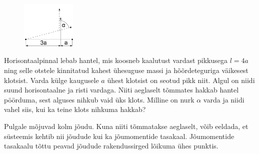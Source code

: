 
\begin{figure}%
\vspace{-5 pt}%
\includegraphics[width=0.23\textwidth]{2015-v3g-09-hantel}%
\vspace{-15 pt}%
\end{figure}
Horisontaalpinnal lebab hantel, mis koosneb kaalutust vardast pikkusega $l=4a$ ning selle otstele kinnitatud kahest ühesuguse massi ja hõõrdeteguriga väikesest klotsist. Varda külge kaugusele $a$ ühest klotsist on seotud pikk niit. Algul on niidi suund horisontaalne ja risti vardaga. Niiti aeglaselt tõmmates hakkab hantel pöörduma, sest alguses nihkub vaid üks klots. Milline on nurk $\alpha$ varda ja niidi vahel siis, kui ka teine klots nihkuma hakkab?

\hint
Pulgale mõjuvad kolm jõudu. Kuna niiti tõmmatakse aeglaselt, võib eeldada, et süsteemis kehtib nii jõudude kui ka jõumomentide tasakaal. Jõumomentide tasakaalu tõttu peavad jõudude rakendussirged lõikuma ühes punktis.

